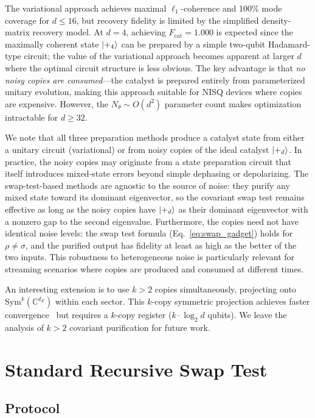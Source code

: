 \documentclass[prx,twocolumn,superscriptaddress,longbibliography,floatfix]{revtex4-2}
\begin{document}
The variational approach achieves maximal $\ell_1$-coherence and 100\% mode coverage for $d \leq 16$, but recovery fidelity is limited by the simplified density-matrix recovery model.
At $d = 4$, achieving $F_\mathrm{cat} = 1.000$ is expected since the maximally coherent state $\ket{+_4}$ can be prepared by a simple two-qubit Hadamard-type circuit; the value of the variational approach becomes apparent at larger $d$ where the optimal circuit structure is less obvious.
The key advantage is that \emph{no noisy copies are consumed}---the catalyst is prepared entirely from parameterized unitary evolution, making this approach suitable for NISQ devices where copies are expensive.
However, the $N_\theta \sim O(d^2)$ parameter count makes optimization intractable for $d \geq 32$.

We note that all three preparation methods produce a catalyst state from either a unitary circuit (variational) or from noisy copies of the ideal catalyst $\ket{+_d}$.
In practice, the noisy copies may originate from a state preparation circuit that itself introduces mixed-state errors beyond simple dephasing or depolarizing.
The swap-test-based methods are agnostic to the source of noise: they purify any mixed state toward its dominant eigenvector, so the covariant swap test remains effective as long as the noisy copies have $\ket{+_d}$ as their dominant eigenvector with a nonzero gap to the second eigenvalue.
Furthermore, the copies need not have identical noise levels: the swap test formula (Eq.~\ref{eq:swap_gadget}) holds for $\rho \neq \sigma$, and the purified output has fidelity at least as high as the better of the two inputs.
This robustness to heterogeneous noise is particularly relevant for streaming scenarios where copies are produced and consumed at different times.

An interesting extension is to use $k > 2$ copies simultaneously, projecting onto $\mathrm{Sym}^k(\mathbb{C}^{d_E})$ within each sector.
This $k$-copy symmetric projection achieves faster convergence~\cite{Childs2025,Yao2025} but requires a $k$-copy register ($k \cdot \log_2 d$ qubits).
We leave the analysis of $k > 2$ covariant purification for future work.


\section{Standard Recursive Swap Test}
\label{sec:standard_swap}

\subsection{Protocol}
\label{sec:standard_protocol}
\end{document}

